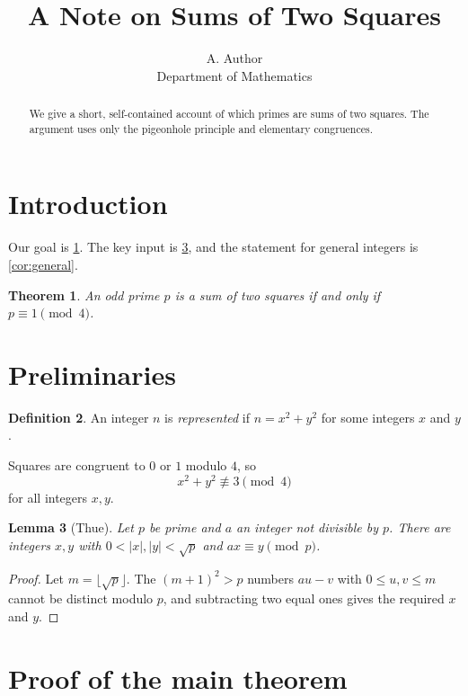 \documentclass{article}
\title{A Note on Sums of Two Squares}
\author{A. Author\\ Department of Mathematics}
\date{}
\newtheorem{theorem}{Theorem}[section]
\newtheorem{lemma}[theorem]{Lemma}
\theoremstyle{definition}
\newtheorem{definition}[theorem]{Definition}
\numberwithin{equation}{section}
\begin{document}
\maketitle

\begin{abstract}
We give a short, self-contained account of which primes are sums of two
squares. The argument uses only the pigeonhole principle and elementary
congruences.
\end{abstract}

\section{Introduction}

Our goal is \cref{thm:main}. The key input is \cref{lem:thue}, and the
statement for general integers is \cref{cor:general}.

\begin{theorem}\label{thm:main}
An odd prime $p$ is a sum of two squares if and only if $p \equiv 1
\pmod 4$.
\end{theorem}

\section{Preliminaries}

\begin{definition}\label{def:rep}
An integer $n$ is \emph{represented} if $n = x^2 + y^2$ for some integers
$x$ and $y$.
\end{definition}

Squares are congruent to $0$ or $1$ modulo $4$, so
\begin{equation}\label{eq:mod4}
  x^2 + y^2 \not\equiv 3 \pmod 4
\end{equation}
for all integers $x, y$.

\begin{lemma}[Thue]\label{lem:thue}
Let $p$ be prime and $a$ an integer not divisible by $p$. There are
integers $x, y$ with $0 < |x|, |y| < \sqrt{p}$ and
$ax \equiv y \pmod p$.
\end{lemma}

\begin{proof}
Let $m = \lfloor \sqrt{p} \rfloor$. The $(m+1)^2 > p$ numbers $au - v$ with
$0 \le u, v \le m$ cannot be distinct modulo $p$, and subtracting two equal
ones gives the required $x$ and $y$.
\end{proof}

\section{Proof of the main theorem}
\end{document}
